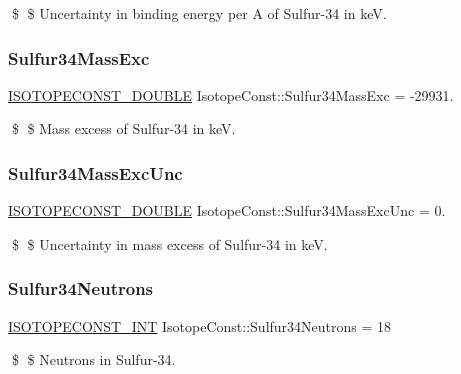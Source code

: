 \$ \$ Uncertainty in binding energy per A of Sulfur-\/34 in keV. \mbox{\label{group___isotope_const-_sulfur-_s34_gafa1f7bd74dd5e2a009fc44a2821f68d2}} 
\subsubsection{\texorpdfstring{Sulfur34\+Mass\+Exc}{Sulfur34MassExc}}
{\footnotesize\ttfamily \mbox{\hyperlink{group___isotope_const-_macros_ga8f45a7272ce02c0b4c65c44636ed719a}{I\+S\+O\+T\+O\+P\+E\+C\+O\+N\+S\+T\+\_\+\+D\+O\+U\+B\+LE}} Isotope\+Const\+::\+Sulfur34\+Mass\+Exc = -\/29931.}

\$ \$ Mass excess of Sulfur-\/34 in keV. \mbox{\label{group___isotope_const-_sulfur-_s34_gaccacfe0907d6c1e7637133dceff93a57}} 
\subsubsection{\texorpdfstring{Sulfur34\+Mass\+Exc\+Unc}{Sulfur34MassExcUnc}}
{\footnotesize\ttfamily \mbox{\hyperlink{group___isotope_const-_macros_ga8f45a7272ce02c0b4c65c44636ed719a}{I\+S\+O\+T\+O\+P\+E\+C\+O\+N\+S\+T\+\_\+\+D\+O\+U\+B\+LE}} Isotope\+Const\+::\+Sulfur34\+Mass\+Exc\+Unc = 0.}

\$ \$ Uncertainty in mass excess of Sulfur-\/34 in keV. \mbox{\label{group___isotope_const-_sulfur-_s34_ga4e0aa47f5ab4cff31e062a9a877543a5}} 
\subsubsection{\texorpdfstring{Sulfur34\+Neutrons}{Sulfur34Neutrons}}
{\footnotesize\ttfamily \mbox{\hyperlink{group___isotope_const-_macros_ga5f18360b3e99483a35c32d789e62621c}{I\+S\+O\+T\+O\+P\+E\+C\+O\+N\+S\+T\+\_\+\+I\+NT}} Isotope\+Const\+::\+Sulfur34\+Neutrons = 18}

\$ \$ Neutrons in Sulfur-\/34. \mbox{\label{group___isotope_const-_sulfur-_s34_gae8623a24ed6c9f6db0790fb7aa9859a0}} 
